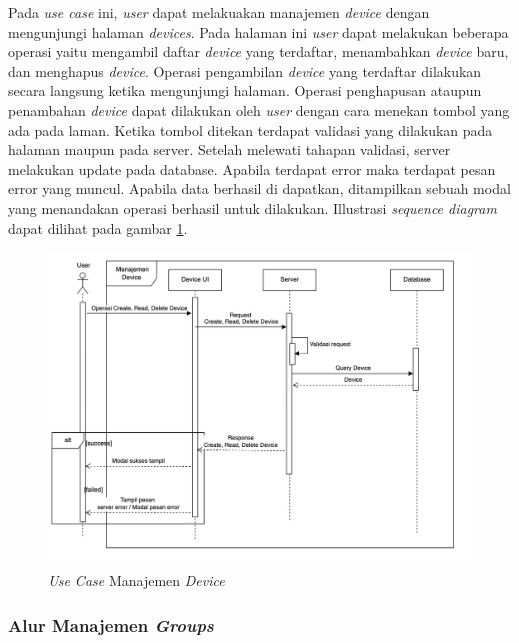 Pada \textit{use case} ini, \textit{user} dapat melakuakan manajemen \textit{device} dengan mengunjungi halaman \textit{devices}. Pada halaman ini \textit{user} dapat melakukan beberapa operasi yaitu mengambil daftar \textit{device} yang terdaftar, menambahkan \textit{device} baru, dan menghapus \textit{device}. Operasi pengambilan \textit{device} yang terdaftar dilakukan secara langsung ketika mengunjungi halaman. Operasi penghapusan ataupun penambahan \textit{device} dapat dilakukan oleh \textit{user} dengan cara menekan tombol yang ada pada laman. Ketika tombol ditekan terdapat validasi yang dilakukan pada halaman maupun pada server. Setelah melewati tahapan validasi, server melakukan update pada database. Apabila terdapat error maka terdapat pesan error yang muncul. Apabila data berhasil di dapatkan, ditampilkan sebuah modal yang menandakan operasi berhasil untuk dilakukan. Illustrasi \textit{sequence diagram} dapat dilihat pada gambar \ref{fig:usecase-08}.


\begin{figure}[ht]
  \centering
  \includegraphics[width=1\textwidth]{resources/chapter-3/usecase/uc-08.jpg}
  \caption{\textit{Use Case} Manajemen \textit{Device}}
  \label{fig:usecase-08}
\end{figure}

\pagebreak

\subsubsection{Alur Manajemen \textit{Groups}}


